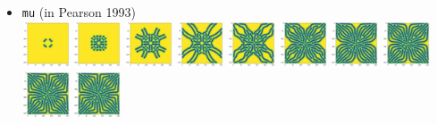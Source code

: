 \begin{itemize}
\item {\tt mu} (in Pearson 1993)\\
\includegraphics[width=1.4cm]{python_codes/fieldstone_171/pearson93/mu_solution_0001000_u}
\includegraphics[width=1.4cm]{python_codes/fieldstone_171/pearson93/mu_solution_0005000_u}
\includegraphics[width=1.4cm]{python_codes/fieldstone_171/pearson93/mu_solution_0010000_u}
\includegraphics[width=1.4cm]{python_codes/fieldstone_171/pearson93/mu_solution_0015000_u}
\includegraphics[width=1.4cm]{python_codes/fieldstone_171/pearson93/mu_solution_0020000_u}
\includegraphics[width=1.4cm]{python_codes/fieldstone_171/pearson93/mu_solution_0030000_u}
\includegraphics[width=1.4cm]{python_codes/fieldstone_171/pearson93/mu_solution_0040000_u}
\includegraphics[width=1.4cm]{python_codes/fieldstone_171/pearson93/mu_solution_0050000_u}
\includegraphics[width=1.4cm]{python_codes/fieldstone_171/pearson93/mu_solution_0075000_u}
\includegraphics[width=1.4cm]{python_codes/fieldstone_171/pearson93/mu_solution_final_u}


\end{itemize}
